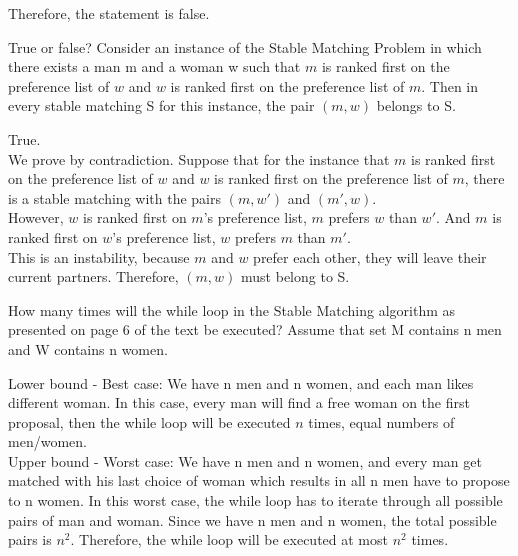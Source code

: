\documentclass{cpsc413Solutions}
\begin{document}
\begin{problemlist}
\begin{problem}
\begin{answer}
Therefore, the statement is false.
\newline
\end{answer}
\end{problem}



\pbitem True or false? Consider an instance of the Stable Matching Problem in which there exists a man m and a woman w such that $m$ is ranked first on the
preference list of $w$ and $w$ is ranked first on the preference list of $m$. Then in
every stable matching S for this instance, the pair $(m, w)$ belongs to S.
\begin{problem}
\begin{answer}
\newline
True.\\
We prove by contradiction. Suppose that for the instance that $m$ is ranked first on the preference list of $w$ and $w$ is ranked first on the preference list of $m$, there is a stable matching with the pairs $(m,w')$ and $(m',w)$.\\
However, $w$ is ranked first on $m$'s preference list, $m$ prefers $w$ than $w'$. And $m$ is ranked first on $w$'s preference list, $w$ prefers $m$ than $m'$.\\
This is an instability, because $m$ and $w$ prefer each other, they will leave their current partners.
Therefore, $(m,w)$ must belong to S.
\newline

\end{answer}
\end{problem}


\pbitem How many times will the while loop in the Stable Matching algorithm as presented on page 6 of the text be executed? Assume that set M contains n men and W contains n women.
\begin{problem}
\begin{answer}
\newline
Lower bound - Best case: We have n men and n women, and each man likes different woman. In this case, every man will find a free woman on the first proposal, then the while loop will be executed $n$ times, equal numbers of men/women.\\

Upper bound - Worst case: We have n men and n women, and every man get matched with his last choice of woman which results in all n men have to propose to n women. In this worst case, the while loop has to iterate through all possible pairs of man and woman. Since we have n men and n women, the total possible pairs is $n^2$. Therefore, the while loop will be executed at most $n^2$ times.
\newline


\end{answer}
\end{problem}
\end{problemlist}
\end{document}
